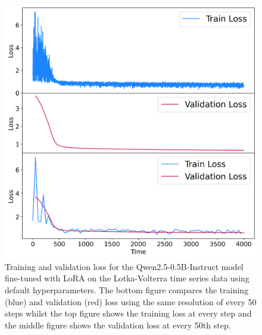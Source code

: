 \documentclass[11pt,a4paper]{article}
\begin{document}
\begin{figure}[h]
    \centering
    \includegraphics[width=\columnwidth, keepaspectratio]{../plots/lora_default_loss.png}
    \caption{Training and validation loss for the Qwen2.5-0.5B-Instruct model fine-tuned with LoRA on the Lotka-Volterra time series data using default hyperparameters. The bottom figure compares the training (blue) and validation (red) loss using the same resolution of every 50 steps whilst the top figure shows the training loss at every step and the middle figure shows the validation loss at every 50th step.}
    \label{fig:lora_default_loss}
\end{figure}
\end{document}
